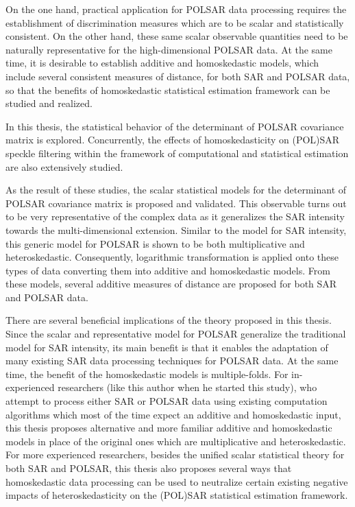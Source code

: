 


\begin{abstracts}        %

On the one hand, practical application for POLSAR data processing requires the establishment of discrimination measures
  which are to be scalar and statistically consistent.
On the other hand, these same scalar observable quantities need to be naturally representative for the high-dimensional POLSAR data.
At the same time, it is desirable to establish additive and homoskedastic models, which include several consistent measures of distance, for both SAR and POLSAR data, so that the benefits of homoskedastic statistical estimation framework can be studied and realized.

In this thesis, the statistical behavior of the determinant of POLSAR covariance matrix is explored.
Concurrently, the effects of homoskedasticity on (POL)SAR speckle filtering within the framework of computational and statistical estimation are also extensively studied.

As the result of these studies, the scalar statistical models for the determinant of POLSAR covariance matrix is proposed and validated.
This observable turns out to be very representative of the complex data as it generalizes the SAR intensity towards the multi-dimensional extension.
Similar to the model for SAR intensity, this generic model for POLSAR is shown to be both multiplicative and heteroskedastic.
Consequently, logarithmic transformation is applied onto these types of data converting them into additive and homoskedastic models.
From these models, several additive measures of distance are proposed for both SAR and POLSAR data.

There are several beneficial implications of the theory proposed in this thesis. 
Since the scalar and representative model for POLSAR generalize the traditional model for SAR intensity, its main benefit is that it enables the adaptation of many existing SAR data processing techniques for POLSAR data.
At the same time, the benefit of the homoskedastic models is multiple-folds.
For in-experienced researchers (like this author when he started this study),
  who attempt to process either SAR or POLSAR data using existing computation algorithms
  which most of the time expect an additive and homoskedastic input,
  this thesis proposes alternative and more familiar additive and homoskedastic models
    in place of the original ones which are multiplicative and heteroskedastic.
For more experienced researchers, besides the unified scalar statistical theory for both SAR and POLSAR, 
  this thesis also proposes several ways that homoskedastic data processing can be used to neutralize certain existing negative impacts of heteroskedasticity on the (POL)SAR statistical estimation framework.


\end{abstracts}
